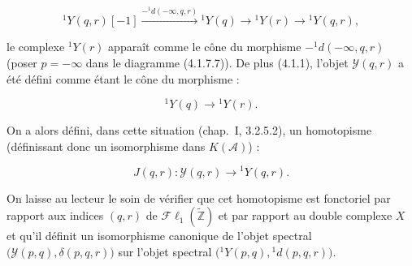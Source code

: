 \begin{equation}
{}^{1}\!Y(q,r)[-1]
\xrightarrow{-{}^{1}\!d(-\infty,q,r)}
{}^{1}\!Y(q)\longrightarrow{}^{1}\!Y(r)\longrightarrow{}^{1}\!Y(q,r),
\tag{4.1.7.8}
\end{equation}

le complexe ${}^{1}\!Y(r)$ apparaît comme le cône du morphisme
$-{}^{1}\!d(-\infty,q,r)$ (poser $p=-\infty$ dans le diagramme
(4.1.7.7)). De plus (4.1.1), l'objet $\mathcal Y(q,r)$ a été défini comme
étant le cône du morphisme :

\begin{equation}
{}^{1}\!Y(q)\longrightarrow{}^{1}\!Y(r).
\tag{4.1.7.9}
\end{equation}

On a alors défini, dans cette situation (chap.~I, 3.2.5.2), un homotopisme
(définissant donc un isomorphisme dans $K(\mathcal A)$) :

\begin{equation}
J(q,r)\colon\mathcal Y(q,r)\longrightarrow{}^{1}\!Y(q,r).
\tag{4.1.7.10}
\end{equation}

On laisse au lecteur le soin de vérifier que cet homotopisme est fonctoriel
par rapport aux indices $(q,r)$ de
$\mathcal{F}\ell_1(\widetilde{\mathbb Z})$ et par rapport au double
complexe $X$ et qu'il définit un isomorphisme canonique de l'objet spectral
$\bigl(\mathcal Y(p,q),\delta(p,q,r)\bigr)$ sur l'objet spectral
$\bigl({}^{1}\!Y(p,q),{}^{1}\!d(p,q,r)\bigr)$.
\endgroup
